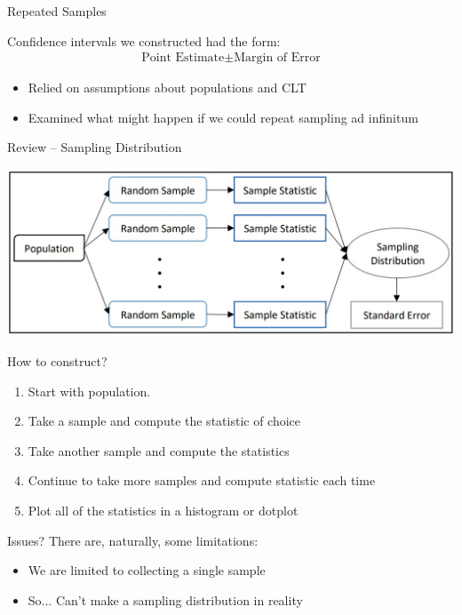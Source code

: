 \documentclass{beamer}
\begin{document}
\begin{frame}{Repeated Samples}
\footnotesize

Confidence intervals we constructed had the form:
\begin{align*}
\text{Point Estimate} \pm \text{Margin of Error}
\end{align*}
\vspace{-6mm}
\begin{itemize}
\item Relied on assumptions about populations and CLT
\item Examined what might happen if we could repeat sampling ad infinitum
\end{itemize}
\end{frame}

\begin{frame}{Review -- Sampling Distribution}
\begin{center}
    \includegraphics[scale=.6]{img/sampling_distr_method.jpg}
\end{center}
How to construct?
\begin{enumerate}
    \item Start with population.
    \item Take a sample and compute the statistic of choice
    \item Take another sample and compute the statistics
    \item Continue to take more samples and compute statistic each time
    \item Plot all of the statistics in a histogram or dotplot
\end{enumerate}
\end{frame}

\begin{frame}{Issues?}
There are, naturally, some limitations:
\begin{itemize}
\item We are limited to collecting a single sample
\item So... Can't make a sampling distribution in reality
\end{itemize}
\end{frame}
\end{document}
